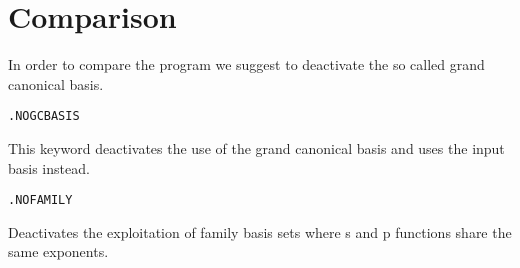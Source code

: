 \section{Comparison}

In order to compare the {\lsdalton} program
we suggest to deactivate the so called grand canonical basis. 
\begin{verbatim}
.NOGCBASIS
\end{verbatim}
This keyword deactivates the use of the grand canonical basis and uses the input basis instead. 
\begin{verbatim}
.NOFAMILY
\end{verbatim}
Deactivates the exploitation of family basis sets where s and p functions share the same exponents. 






